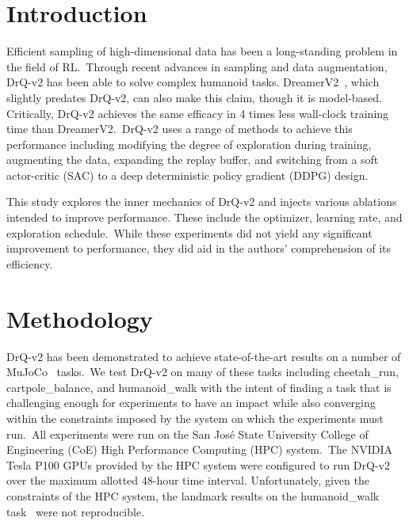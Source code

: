 \documentclass[conference]{./IEEEtran/IEEEtran} %
\begin{document}
    \section{Introduction}\label{sec:introduction}
    Efficient sampling of high-dimensional data has been a long-standing problem in the field of RL.\ Through recent
    advances in sampling and data augmentation, DrQ-v2 has been able to solve complex humanoid tasks.
    DreamerV2~\cite{DreamerV2}, which slightly predates DrQ-v2, can also make this claim, though it is model-based.
    Critically, DrQ-v2 achieves the same efficacy in 4 times less wall-clock training time than DreamerV2.\ DrQ-v2
    uses a range of methods to achieve this performance including modifying the degree of exploration during training,
    augmenting the data, expanding the replay buffer, and switching from a soft actor-critic (SAC) to a deep
    deterministic policy gradient (DDPG) design.


    This study explores the inner mechanics of DrQ-v2 and injects various ablations intended to improve performance.
    These include the optimizer, learning rate, and exploration schedule.\ While these experiments did not yield any
    significant improvement to performance, they did aid in the authors' comprehension of its efficiency.

    \section{Methodology}\label{sec:methodology}
    DrQ-v2 has been demonstrated to achieve state-of-the-art results on a number of MuJoCo~\cite{todorov2012mujoco}
    tasks.\ We test DrQ-v2 on many of these tasks including cheetah\_run, cartpole\_balance, and humanoid\_walk with the
    intent of finding a task that is challenging enough for experiments to have an impact while also converging within
    the constraints imposed by the system on which the experiments must run.\ All experiments were run on the San Jos\'e
    State University College of Engineering (CoE) High Performance Computing (HPC) system.\ The NVIDIA Tesla P100 GPUs
    provided by the HPC system were configured to run DrQ-v2 over the maximum allotted 48-hour time interval.
    Unfortunately, given the constraints of the HPC system, the landmark results on the humanoid\_walk task~\cite{DrQv2}
    were not reproducible.
\end{document}
